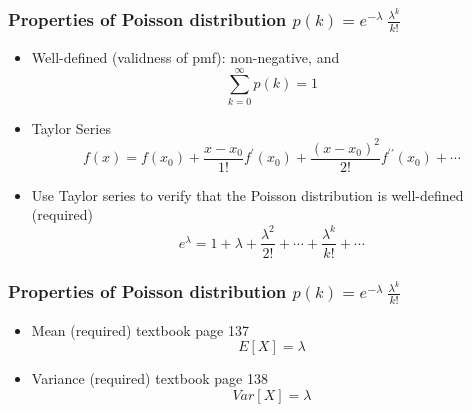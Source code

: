 \documentclass[slidestop,compress,mathserif]{beamer}
\begin{document}
%
%
%
%
%
%
\begin{frame}\frametitle{Properties of Poisson distribution $p(k) = e^{-\lambda}\ \frac{\lambda^k}{k!}$}

\begin{itemize}
\item Well-defined (validness of pmf): non-negative, and
\[\sum_{k = 0}^{\infty} p(k) = 1\]
\end{itemize}

\vfill
\begin{itemize}
\item Taylor Series
\[ f(x) = f(x_0) + \frac{x-x_0}{1!}f^{\prime}(x_0) + \frac{(x-x_0)^2}{2!} f^{\prime\prime}(x_0) + \cdots \]

\item Use Taylor series to verify that the Poisson distribution is well-defined  ({\color{red}required})
\[ e^{\lambda} = 1 + \lambda + \frac{\lambda^2}{2!} + \cdots + \frac{\lambda^k}{k!}+\cdots\]
\end{itemize}



\end{frame}
\begin{frame}\frametitle{Properties of Poisson distribution $p(k) = e^{-\lambda}\ \frac{\lambda^k}{k!}$}

\begin{itemize}
\item Mean ({\color{red}required}) textbook page 137
\[E[X] = \lambda \]

\vspace{15mm}
\pause
\item Variance ({\color{red}required}) textbook page 138
\[Var[X] = \lambda \]

\end{itemize}

\end{frame}
\end{document}
